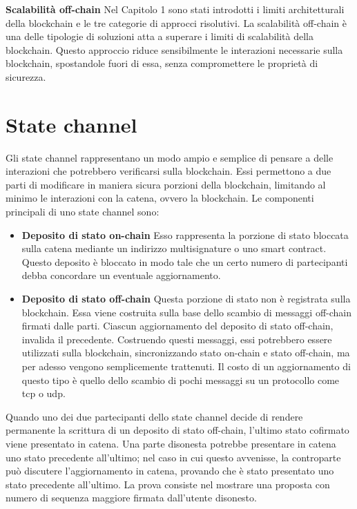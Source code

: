 \documentclass[12pt,italian,]{book}
\providecommand{\tightlist}{%
  \setlength{\itemsep}{0pt}\setlength{\parskip}{0pt}}
\begin{document}
\textbf{\textbf{Scalabilità off-chain}} Nel Capitolo 1 sono stati introdotti i limiti architetturali della blockchain e le tre categorie di approcci risolutivi. La scalabilità off-chain è una delle tipologie di soluzioni atta a superare i limiti di scalabilità della blockchain. Questo approccio riduce sensibilmente le interazioni necessarie sulla blockchain, spostandole fuori di essa, senza compromettere le proprietà di sicurezza.

\hypertarget{state-channel}{%
\section{State channel}\label{state-channel}}

Gli state channel rappresentano un modo ampio e semplice di pensare a delle interazioni che potrebbero verificarsi sulla blockchain. Essi permettono a due parti di modificare in maniera sicura porzioni della blockchain, limitando al minimo le interazioni con la catena, ovvero la blockchain. Le componenti principali di uno state channel sono:

\begin{itemize}
\tightlist
\item
  \textbf{\textbf{Deposito di stato on-chain}} Esso rappresenta la porzione di stato bloccata sulla catena mediante un indirizzo multisignature o uno smart contract. Questo deposito è bloccato in modo tale che un certo numero di partecipanti debba concordare un eventuale aggiornamento.
\item
  \textbf{\textbf{Deposito di stato off-chain}} Questa porzione di stato non è registrata sulla blockchain. Essa viene costruita sulla base dello scambio di messaggi off-chain firmati dalle parti. Ciascun aggiornamento del deposito di stato off-chain, invalida il precedente. Costruendo questi messaggi, essi potrebbero essere utilizzati sulla blockchain, sincronizzando stato on-chain e stato off-chain, ma per adesso vengono semplicemente trattenuti. Il costo di un aggiornamento di questo tipo è quello dello scambio di pochi messaggi su un protocollo come tcp o udp.
\end{itemize}

Quando uno dei due partecipanti dello state channel decide di rendere permanente la scrittura di un deposito di stato off-chain, l'ultimo stato cofirmato viene presentato in catena. Una parte disonesta potrebbe presentare in catena uno stato precedente all'ultimo; nel caso in cui questo avvenisse, la controparte può discutere l'aggiornamento in catena, provando che è stato presentato uno stato precedente all'ultimo. La prova consiste nel mostrare una proposta con numero di sequenza maggiore firmata dall'utente disonesto.
\end{document}

